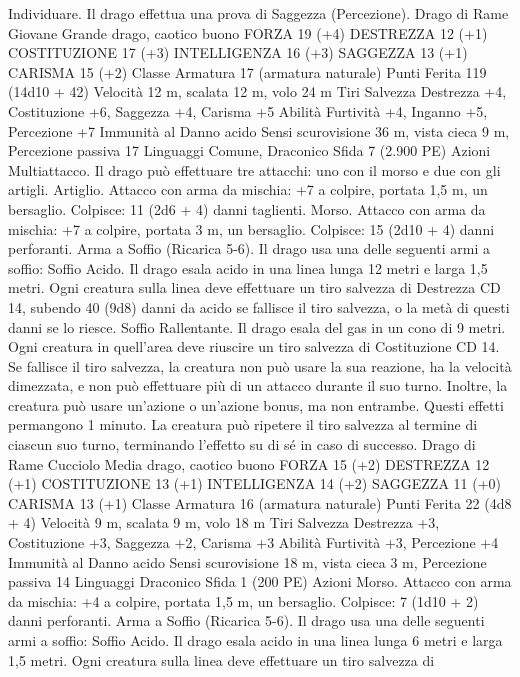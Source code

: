 \begin{multicols}{2}
Individuare. Il drago effettua una prova di Saggezza (Percezione).
Drago di Rame Giovane
Grande drago, caotico buono
FORZA 19 (+4)
DESTREZZA 12 (+1)
COSTITUZIONE 17 (+3)
INTELLIGENZA 16 (+3)
SAGGEZZA 13 (+1)
CARISMA 15 (+2)
Classe Armatura 17 (armatura naturale)
Punti Ferita 119 (14d10 + 42)
Velocità 12 m, scalata 12 m, volo 24 m
Tiri Salvezza Destrezza +4, Costituzione +6, Saggezza +4, Carisma +5
Abilità Furtività +4, Inganno +5, Percezione +7
Immunità al Danno acido
Sensi scurovisione 36 m, vista cieca 9 m, Percezione passiva 17
Linguaggi Comune, Draconico
Sfida 7 (2.900 PE)
Azioni
Multiattacco. Il drago può effettuare tre attacchi: uno con il
morso e due con gli artigli.
Artiglio. Attacco con arma da mischia: +7 a colpire, portata 1,5
m, un bersaglio.
Colpisce: 11 (2d6 + 4) danni taglienti.
Morso. Attacco con arma da mischia: +7 a colpire, portata 3 m,
un bersaglio.
Colpisce: 15 (2d10 + 4) danni perforanti.
Arma a Soffio (Ricarica 5-6). Il drago usa una delle seguenti armi
a soffio:
Soffio Acido. Il drago esala acido in una linea lunga 12 metri e larga
1,5 metri. Ogni creatura sulla linea deve effettuare un tiro salvezza di
Destrezza CD 14, subendo 40 (9d8) danni da acido se fallisce il tiro
salvezza, o la metà di questi danni se lo riesce.
Soffio Rallentante. Il drago esala del gas in un cono di 9 metri. Ogni
creatura in quell’area deve riuscire un tiro salvezza di Costituzione
CD 14. Se fallisce il tiro salvezza, la creatura non può usare la sua
reazione, ha la velocità dimezzata, e non può effettuare più di un
attacco durante il suo turno. Inoltre, la creatura può usare un’azione o
un’azione bonus, ma non entrambe. Questi effetti permangono 1
minuto. La creatura può ripetere il tiro salvezza al termine di ciascun
suo turno, terminando l’effetto su di sé in caso di successo.
Drago di Rame Cucciolo
Media drago, caotico buono
FORZA 15 (+2)
DESTREZZA 12 (+1)
COSTITUZIONE 13 (+1)
INTELLIGENZA 14 (+2)
SAGGEZZA 11 (+0)
CARISMA 13 (+1)
Classe Armatura 16 (armatura naturale)
Punti Ferita 22 (4d8 + 4)
Velocità 9 m, scalata 9 m, volo 18 m
Tiri Salvezza Destrezza +3, Costituzione +3, Saggezza +2, Carisma +3
Abilità Furtività +3, Percezione +4
Immunità al Danno acido
Sensi scurovisione 18 m, vista cieca 3 m, Percezione passiva 14
Linguaggi Draconico
Sfida 1 (200 PE)
Azioni
Morso. Attacco con arma da mischia: +4 a colpire, portata 1,5
m, un bersaglio.
Colpisce: 7 (1d10 + 2) danni perforanti.
Arma a Soffio (Ricarica 5-6). Il drago usa una delle seguenti armi
a soffio:
Soffio Acido. Il drago esala acido in una linea lunga 6 metri e larga
1,5 metri. Ogni creatura sulla linea deve effettuare un tiro salvezza di

\end{multicols}
